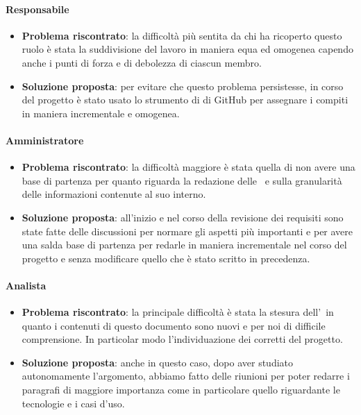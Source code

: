 		\paragraph{Responsabile}
			\begin{itemize}
				\item \textbf{Problema riscontrato}: la difficoltà più sentita da chi ha ricoperto questo ruolo è stata la suddivisione del lavoro in maniera equa ed omogenea capendo anche i punti di forza e di debolezza di ciascun membro.
				\item \textbf{Soluzione proposta}: per evitare che questo problema persistesse, in corso del progetto è stato usato lo strumento di  di GitHub per assegnare i compiti in maniera incrementale e omogenea.
			\end{itemize}

		\paragraph{Amministratore}
			\begin{itemize}
				\item \textbf{Problema riscontrato}: la difficoltà maggiore è stata quella di non avere una base di partenza per quanto riguarda la redazione delle \NdPd\ e sulla granularità delle informazioni contenute al suo interno.
				\item \textbf{Soluzione proposta}: all'inizio e nel corso della revisione dei requisiti sono state fatte delle discussioni per normare gli aspetti più importanti e per avere una salda base di partenza per redarle in maniera incrementale nel corso del progetto e senza modificare quello che è stato scritto in precedenza.
			\end{itemize}

		\paragraph{Analista}
			\begin{itemize}
				\item \textbf{Problema riscontrato}: la principale difficoltà è stata la stesura dell'\AdRd\ in quanto i contenuti di questo documento sono nuovi e per noi di difficile comprensione. In particolar modo l'individuazione dei corretti  del progetto.
				\item \textbf{Soluzione proposta}: anche in questo caso, dopo aver studiato autonomamente l'argomento, abbiamo fatto delle riunioni per poter redarre i paragrafi di maggiore importanza come in particolare quello riguardante le tecnologie e i casi d'uso.
			\end{itemize}

